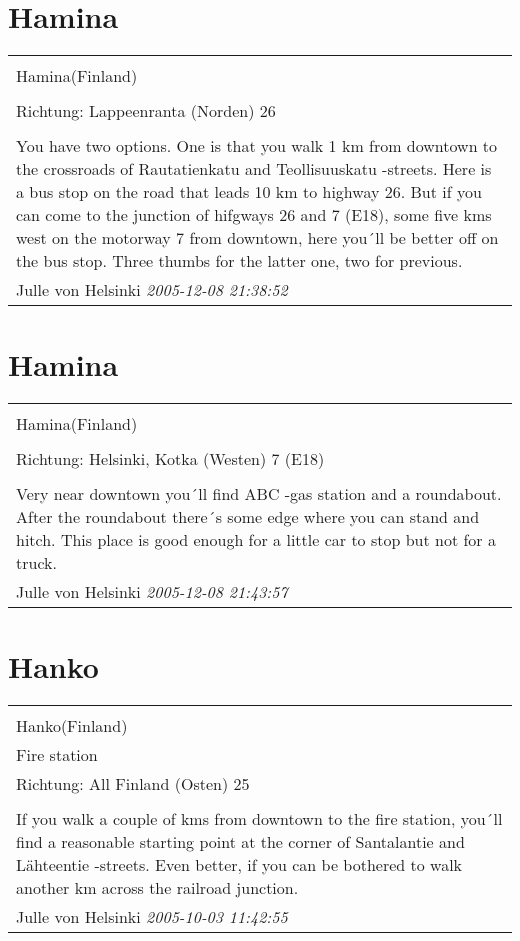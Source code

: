 \documentclass[a4paper,12pt]{article}
\begin{document}
\section{Hamina}
\begin{tabular}{|p{13cm}|}
\hline\\
Hamina(Finland)\\
\\
Richtung: Lappeenranta (Norden) 26 \\
\hline\\
You have two options. One is that you walk 1 km from downtown to the crossroads of Rautatienkatu and Teollisuuskatu -streets. Here is a bus stop on the road that leads 10 km to highway 26. But if you can come to the junction of hifgways 26 and 7 (E18), some five kms west on the motorway 7 from downtown, here you´ll be better off on the bus stop. Three thumbs for the latter one, two for previous. \\
Julle von Helsinki \textit{ 2005-12-08 21:38:52 }\\\hline
\end{tabular}


\section{Hamina}
\begin{tabular}{|p{13cm}|}
\hline\\
Hamina(Finland)\\
\\
Richtung: Helsinki, Kotka (Westen) 7 (E18) \\
\hline\\
Very near downtown you´ll find ABC
-gas station and a roundabout. After the roundabout there´s some edge where you can stand and hitch. This place is good enough for a little car to stop but not for a truck. \\
Julle von Helsinki \textit{ 2005-12-08 21:43:57 }\\\hline
\end{tabular}


\section{Hanko}
\begin{tabular}{|p{13cm}|}
\hline\\
Hanko(Finland)\\
Fire station\\
Richtung: All Finland (Osten) 25 \\
\hline\\
If you walk a couple of kms from downtown to the fire station, you´ll find a reasonable starting point at the corner of Santalantie and Lähteentie -streets. Even better, if you can be bothered to walk another km across the railroad junction. \\
Julle von Helsinki \textit{ 2005-10-03 11:42:55 }\\\hline
\end{tabular}
\end{document}
